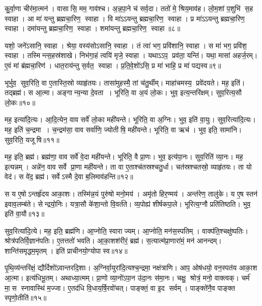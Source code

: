 कु॒र्वा॒णा चीर॑मा॒त्मन॑। वासासि॒ मम॒ गाव॑श्च। अ॒न्न॒पा॒ने च॑ सर्व॒दा। ततो॑ मे॒ श्रिय॒माव॑ह। लो॒म॒शां प॒शुभि॑ स॒ह स्वाहा। आ मा॑ यन्तु ब्रह्मचा॒रिण॒ स्वाहा। वि मा॑ऽऽयन्तु ब्रह्मचा॒रिण॒ स्वाहा। प्र मा॑ऽऽयन्तु ब्रह्मचा॒रिण॒ स्वाहा। दमा॑यन्तु ब्रह्मचा॒रिण॒ स्वाहा। शमा॑यन्तु ब्रह्मचा॒रिण॒ स्वाहा॥८॥

    यशो॒ जने॑ऽसानि॒ स्वाहा। श्रेया॒\an{} वस्य॑सोऽसानि॒ स्वाहा। तं त्वा॑ भग॒ प्रवि॑शानि॒ स्वाहा। स मा॑ भग॒ प्रवि॑श॒ स्वाहा। तस्मिन्त्स॒हस्र॑शाखे। निभ॑गा॒हं त्वयि॑ मृजे॒ स्वाहा। यथाऽऽप॒ प्रव॑ता॒ यन्ति॑। यथा॒ मासा॑ अहर्ज॒रम्। ए॒वं मां ब्र॑ह्मचा॒रिण॑। धात॒राय॑न्तु स॒र्वत॒ स्वाहा। प्र॒ति॒वे॒शो॑ऽसि॒ प्र मा॑ भाहि॒ प्र मा॑ पद्यस्व॥९॥
\anuvakamend%

भूर्भुव॒ सुव॒रिति॒ वा ए॒तास्ति॒स्रो व्याहृ॑तयः। तासा॑मुहस्मै॒ तां च॑तु॒र्थीम्। माहा॑चमस्य॒ प्रवे॑दयते। मह॒ इति॑। तद्ब्रह्म॑। स आ॒त्मा। अङ्गान्य॒न्या दे॒वता। भूरिति॒ वा अ॒यं लो॒कः। भुव॒ इत्य॒न्तरि॑क्षम्। सुव॒रित्य॒सौ लो॒कः॥१०॥

मह॒ इत्या॑दि॒त्यः। आ॒दि॒त्येन॒ वाव सर्वे॑ लो॒का मही॑यन्ते। भूरिति॒ वा अ॒ग्निः। भुव॒ इति॑ वा॒युः। सुव॒रित्या॑दि॒त्यः। मह॒ इति॑ च॒न्द्रमा। च॒न्द्रम॑सा॒ वाव सर्वा॑णि॒ ज्योतीषि॒ मही॑यन्ते। भूरिति॒ वा ऋच॑। भुव॒ इति॒ सामा॑नि। सुव॒रिति॒ यजूषि॥११॥

मह॒ इति॒ ब्रह्म॑। ब्रह्म॑णा॒ वाव सर्वे॑ वे॒दा मही॑यन्ते। भूरिति॒ वै प्रा॒णः। भुव॒ इत्य॑पा॒नः। सुव॒रिति॑ व्या॒नः। मह॒ इत्यन्नम्। अन्ने॑न॒ वाव सर्वे प्रा॒णा मही॑यन्ते। ता वा ए॒ताश्च॑तस्रश्चतु॒र्धा। चत॑स्रश्चतस्रो॒ व्याहृ॑तयः। ता यो वेद॑। स वे॑द॒ ब्रह्म॑। सर्वेऽस्मै दे॒वा ब॒लिमाव॑हन्ति॥१२॥
\anuvakamend[अ॒सौ लो॒को यजूषि॒ वेद॒ द्वे च॑]

स य ए॒षोऽन्तर्\mbox{}हृ॑दय आका॒शः। तस्मि॑न्न॒यं पुरु॑षो मनो॒मय॑। अमृ॑तो हिर॒ण्मय॑। अन्त॑रेण॒ तालु॑के। य ए॒ष स्तन॑ इवाव॒लम्ब॑ते। सेन्द्रयो॒निः। यत्रा॒सौ के॑शा॒न्तो वि॒वर्त॑ते। व्य॒पोह्य॑ शीर्\mbox{}षकपा॒ले। भूरित्य॒ग्नौ प्रति॑तिष्ठति। भुव॒ इति॑ वा॒यौ॥१३॥

सुव॒रित्या॑दि॒त्ये। मह॒ इति॒ ब्रह्म॑णि। आ॒प्नोति॒ स्वाराज्यम्। आ॒प्नोति॒ मन॑स॒स्पतिम्। वाक्प॑ति॒श्चक्षु॑ष्पतिः। श्रोत्र॑पतिर्वि॒\-ज्ञान॑पतिः। ए॒तत्ततो॑ भवति। आ॒का॒शश॑रीरं॒ ब्रह्म॑। स॒त्यात्म॑प्रा॒णारा॑मं॒ मन॑ आनन्दम्। शान्ति॑समृद्धम॒मृतम्। इति॑ प्राचीनयो॒ग्योपास्व॥१४॥
\anuvakamend[वा॒याव॒मृत॒मेकं॑ च]

पृ॒थि॒व्य॑न्तरि॑क्षं॒ द्यौर्दिशो॑ऽवान्तरदि॒शाः। अ॒ग्निर्वा॒युरा॑दि॒त्य\-श्च॒न्द्रमा॒ नक्ष॑त्राणि। आप॒ ओष॑धयो॒ वन॒स्पत॑य आका॒श आ॒त्मा। इत्य॑धिभू॒तम्। अथाध्या॒त्मम्। प्रा॒णो व्या॒नो॑ऽपा॒न उ॑दा॒नः स॑मा॒नः। चक्षु॒ श्रोत्रं॒ मनो॒ वाक्त्वक्। चर्म॑ मा॒स स्नावास्थि॑ म॒ज्जा। ए॒तद॑धि वि॒धाय॒र्\mbox{}षि॒रवो॑चत्। पाङ्क्तं॒ वा इ॒द सर्वम्। पाङ्क्ते॑नै॒व पाङ्क्त स्पृणो॒तीति॑॥१५॥
\anuvakamend[सर्व॒मेकं॑ च]

